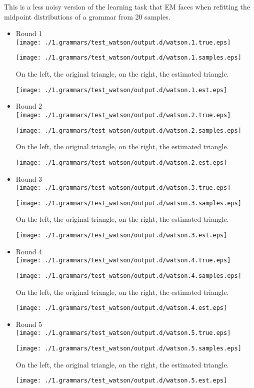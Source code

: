 \documentclass{book}
\begin{document}
This is a less noisy version of the learning task that EM faces when
refitting the midpoint distributions of a grammar from 20 samples.
\begin{itemize}

\item Round 1\\
\label{sec-2_2_1_1}%
\texttt{[image: ./1.grammars/test\_watson/output.d/watson.1.true.eps]}

\texttt{[image: ./1.grammars/test\_watson/output.d/watson.1.samples.eps]}

On the left, the original triangle, on the right, the estimated triangle.

\texttt{[image: ./1.grammars/test\_watson/output.d/watson.1.est.eps]}


\item Round 2\\
\label{sec-2_2_1_2}%
\texttt{[image: ./1.grammars/test\_watson/output.d/watson.2.true.eps]}

\texttt{[image: ./1.grammars/test\_watson/output.d/watson.2.samples.eps]}

On the left, the original triangle, on the right, the estimated triangle.

\texttt{[image: ./1.grammars/test\_watson/output.d/watson.2.est.eps]}


\item Round 3\\
\label{sec-2_2_1_3}%
\texttt{[image: ./1.grammars/test\_watson/output.d/watson.3.true.eps]}

\texttt{[image: ./1.grammars/test\_watson/output.d/watson.3.samples.eps]}

On the left, the original triangle, on the right, the estimated triangle.

\texttt{[image: ./1.grammars/test\_watson/output.d/watson.3.est.eps]}


\item Round 4\\
\label{sec-2_2_1_4}%
\texttt{[image: ./1.grammars/test\_watson/output.d/watson.4.true.eps]}

\texttt{[image: ./1.grammars/test\_watson/output.d/watson.4.samples.eps]}

On the left, the original triangle, on the right, the estimated triangle.

\texttt{[image: ./1.grammars/test\_watson/output.d/watson.4.est.eps]}


\item Round 5\\
\label{sec-2_2_1_5}%
\texttt{[image: ./1.grammars/test\_watson/output.d/watson.5.true.eps]}

\texttt{[image: ./1.grammars/test\_watson/output.d/watson.5.samples.eps]}

On the left, the original triangle, on the right, the estimated triangle.

\texttt{[image: ./1.grammars/test\_watson/output.d/watson.5.est.eps]}

\end{itemize} %
\end{document}
